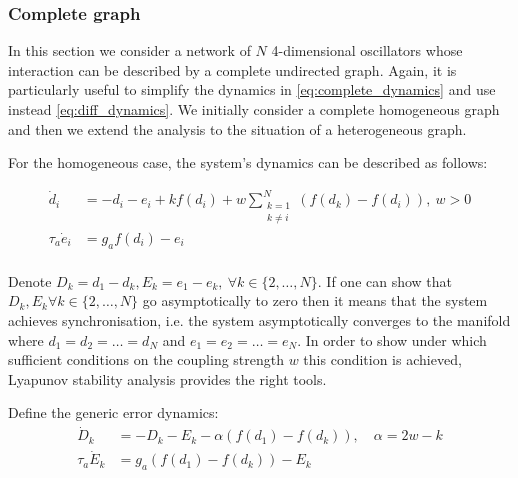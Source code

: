 \subsubsection{Complete graph}
In this section we consider a network of $N$ 4-dimensional oscillators whose interaction can be described by a complete undirected graph. Again, it is particularly useful to simplify the dynamics in \cref{eq:complete_dynamics} and use instead \cref{eq:diff_dynamics}. We initially consider a complete homogeneous graph and then we extend the analysis to the situation of a heterogeneous graph. 

For the homogeneous case, the system's dynamics can be described as follows:

\begin{equation} 
\begin{aligned}
\dot d_{i} &= - d_i - e_i + k f(d_i) + w\sum\limits_{\substack{k=1 \\ k\neq i}}^N (f(d_k) - f(d_i)), \ w > 0\\
\tau_a \dot{e}_{i} &= g_a f(d_i) - e_{i} \\
\end{aligned}
\label{eq:diff_dynamics}
\end{equation}

Denote $D_k = d_1 - d_k, E_k = e_1 - e_k,\ \forall k \in \{2, \dots, N\}$. If one can show that $D_k, E_k \forall k \in \{2, \dots, N\}$ go asymptotically to zero then it means that the system achieves synchronisation, i.e. the system asymptotically converges to the manifold where $d_1 = d_2 = \dots = d_N$ and $e_1 = e_2 = \dots = e_N$. In order to show under which sufficient conditions on the coupling strength $w$ this condition is achieved, Lyapunov stability analysis provides the right  tools.

Define the generic error dynamics:
\begin{equation} 
\begin{aligned}
\dot D_{k} &= - D_k - E_k - \alpha (f(d_1) - f(d_k)),\quad \alpha = 2w-k \\
\tau_a \dot{E}_{k} &= g_a (f(d_1) - f(d_k)) - E_{k} \\
\end{aligned}
\label{eq:err_dynamics}
\end{equation}

